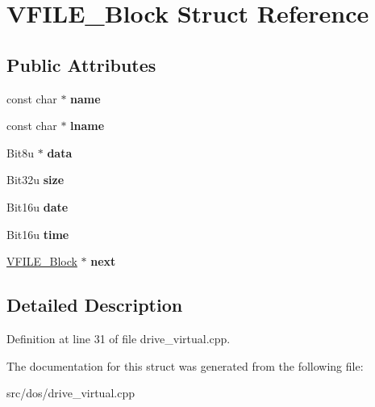 \hypertarget{structVFILE__Block}{\section{V\-F\-I\-L\-E\-\_\-\-Block Struct Reference}
\label{structVFILE__Block}
}
\subsection*{Public Attributes}
\begin{DoxyCompactItemize}
\item 
\hypertarget{structVFILE__Block_aa3a1a3b8db84962a6d2d7d284fb72ff6}{const char $\ast$ {\bfseries name}}\label{structVFILE__Block_aa3a1a3b8db84962a6d2d7d284fb72ff6}

\item 
\hypertarget{structVFILE__Block_a0caac66d7a0d7d6640ff9f143736a85d}{const char $\ast$ {\bfseries lname}}\label{structVFILE__Block_a0caac66d7a0d7d6640ff9f143736a85d}

\item 
\hypertarget{structVFILE__Block_aa6f72136b271fa17b0ec1877ad722921}{Bit8u $\ast$ {\bfseries data}}\label{structVFILE__Block_aa6f72136b271fa17b0ec1877ad722921}

\item 
\hypertarget{structVFILE__Block_a754dce82621341bcf36deba925ff0297}{Bit32u {\bfseries size}}\label{structVFILE__Block_a754dce82621341bcf36deba925ff0297}

\item 
\hypertarget{structVFILE__Block_ad865066cfbe7f8192ced881edbd1fc83}{Bit16u {\bfseries date}}\label{structVFILE__Block_ad865066cfbe7f8192ced881edbd1fc83}

\item 
\hypertarget{structVFILE__Block_adbdd82b26937b970cace6d89e327cb40}{Bit16u {\bfseries time}}\label{structVFILE__Block_adbdd82b26937b970cace6d89e327cb40}

\item 
\hypertarget{structVFILE__Block_a9b503da2b5dd066df75aadc4794b201e}{\hyperlink{structVFILE__Block}{V\-F\-I\-L\-E\-\_\-\-Block} $\ast$ {\bfseries next}}\label{structVFILE__Block_a9b503da2b5dd066df75aadc4794b201e}

\end{DoxyCompactItemize}


\subsection{Detailed Description}


Definition at line 31 of file drive\-\_\-virtual.\-cpp.



The documentation for this struct was generated from the following file\-:\begin{DoxyCompactItemize}
\item 
src/dos/drive\-\_\-virtual.\-cpp\end{DoxyCompactItemize}
